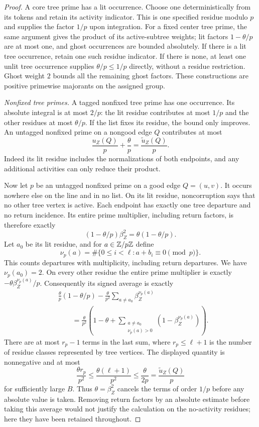 \begin{proof}
A core tree prime has a lit occurrence.  Choose one deterministically
from its tokens and retain its activity indicator.  This is one
specified residue modulo $p$ and supplies the factor $1/p$ upon
integration.  For a fixed center tree prime, the same argument gives
the product of its active-subtree weights; lit factors $1-\theta/p$
are at most one, and ghost occurrences are bounded absolutely.  If
there is a lit tree occurrence, retain one such residue indicator.
If there is none, at least one unlit tree occurrence supplies
$\theta/p\le1/p$ directly, without a residue restriction.  Ghost
weight $2$ bounds all the remaining ghost factors.  These constructions
are positive primewise majorants on the assigned group.

\emph{Nonfixed tree primes.}
A tagged nonfixed tree prime has one occurrence.  Its absolute
integral is at most $2/p$: the lit residue contributes at most $1/p$
and the other residues at most $\theta/p$.  If the list fixes its
residue, the bound only improves.  An untagged nonfixed prime on a
nongood edge $Q$ contributes at most
\[
 \frac{u_Z(Q)}p+\frac\theta p
       =\frac{\widetilde u_Z(Q)}p.
\]
Indeed its lit residue includes the normalizations of both endpoints,
and any additional activities can only reduce their product.

Now let $p$ be an untagged nonfixed prime on a good edge $Q=(u,v)$.
It occurs nowhere else on the line and in no list.  On its lit residue,
noncorruption says that no other tree vertex is active.  Each endpoint
has exactly one tree departure and no return incidence.  Its entire
prime multiplier, including return factors, is therefore exactly
\[
 (1-\theta/p)\beta_Z^2=\theta(1-\theta/p).
\]
Let $a_0$ be its lit residue, and for $a\in\mathbb Z/p\mathbb Z$ define
\[
 \nu_p(a)=\#\{0\le i<\ell:a+b_i\equiv0\pmod p\}.
\]
This counts departures with multiplicity, including return departures.
We have $\nu_p(a_0)=2$.  On every other residue the entire prime
multiplier is exactly $-\theta\beta_Z^{\nu_p(a)}/p$.  Consequently its
signed average is exactly
\begin{align*}
 &\frac\theta p(1-\theta/p)
  -\frac\theta{p^2}\sum_{a\ne a_0}\beta_Z^{\nu_p(a)}\\
 &\qquad=\frac\theta{p^2}\left(
  1-\theta+
  \sum_{\substack{a\ne a_0\\\nu_p(a)>0}}
       (1-\beta_Z^{\nu_p(a)})\right).
\end{align*}
There are at most $r_p-1$ terms in the last sum, where
$r_p\le\ell+1$ is the number of residue classes represented by tree
vertices.  The displayed quantity is nonnegative and at most
\[
 \frac{\theta r_p}{p^2}
 \le\frac{\theta(\ell+1)}{p^2}
 \le\frac{\theta}{2p}
 =\frac{\widetilde u_Z(Q)}p
\]
for sufficiently large $B$.  Thus $\theta=\beta_Z^2$ cancels the
terms of order $1/p$ before any absolute value is taken.
Removing return factors by an absolute estimate before taking this
average would not justify the calculation on the no-activity residues;
here they have been retained throughout.


\end{proof}

